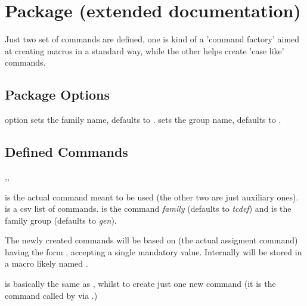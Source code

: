 \documentclass[article,nogeometry,english,tocdepth=3,secdepth=3]{ufrgscca} %
\newif\iffulldoc
\begin{document}
\iffulldoc
\section{ Package (extended documentation)}
Just two set of commands are defined, one is kind of a 'command factory' aimed at creating macros in a standard way, while the other helps create 'case like' commands.


\subsection{Package Options}
\begin{describelist}{option}
	 { sets the family name, defaults to .}
	 { sets the group name, defaults to .}
\end{describelist}

\subsection{Defined Commands}
\begin{codedescribe}{\cmdfactory,\factory,\tcgen@cdef}
	\begin{codesyntax}%
	\end{codesyntax}
	\tsmacro{\cmdfactory}{} is the actual command meant to be used (the other two are just auxiliary ones).  is a csv list of commands.  is the command \emph{family} (defaults to \emph{tcdef}) and  is the family group (defaults to \emph{gen}).

	The newly created commands will be based on \tsmacro{\tcgen@cdef}{} (the actual assigment command) having the form , accepting a single mandatory value. Internally  will be stored in a macro likely named \tsmacro{\fam@grp@cmd}{}.

    \tsmacro{\factory}{} is basically the same as \tsmacro{\cmdfactory}{}, whilst to create just one new command (it is the command called by \tsmacro{\cmdfactory}{} via \tsmacro{\forcsvlist}{}.)
\end{codedescribe}
\end{document}
